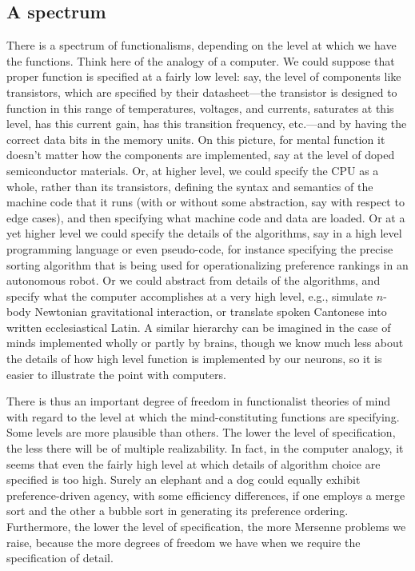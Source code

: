 \subsection{A spectrum}
There is a spectrum of functionalisms, depending on the level at which we have the functions. Think here of the analogy of a computer. 
We could suppose that proper function is specified at a fairly low
level: say, the level of  components like transistors, which are specified by their datasheet---the transistor is designed to 
function in this range of temperatures, voltages, and currents, saturates at this level, has this current gain, has this 
transition frequency, etc.---and by having the correct data bits in the memory units. On this picture, for mental function
it doesn't matter how the components are implemented, say at the level of doped semiconductor materials. Or, at 
higher level, we could specify the CPU as a whole, rather than its transistors, defining the syntax and semantics of the 
machine code that it runs (with or without some abstraction, say with respect to edge cases), and then specifying what machine 
code and data are loaded. Or at a yet higher level we could specify the details of the algorithms, say in a high level 
programming language or even pseudo-code, for instance specifying the precise sorting algorithm that is being used for 
operationalizing preference rankings in an autonomous robot. Or we could abstract from details of the algorithms, and specify 
what the computer accomplishes at a very high level, e.g., simulate $n$-body Newtonian gravitational interaction, or 
translate spoken Cantonese into written ecclesiastical Latin. A similar hierarchy can be imagined in the case of minds
implemented wholly or partly by brains, though we know much less about the details of how high level function is implemented
by our neurons, so it is easier to illustrate the point with computers.

There is thus an important degree of freedom in functionalist theories of mind with regard to the level at which the 
mind-constituting functions are specifying. Some levels are more plausible than others. The lower the level of specification,
the less there will be of multiple realizability. In fact, in the computer analogy, it seems that even the fairly high level
at which details of algorithm choice are specified is too high. Surely an elephant and a dog could equally exhibit preference-driven
agency, with some efficiency differences, if one employs a merge sort and the other a bubble sort in generating its preference 
ordering. Furthermore, the lower the level of specification, the more Mersenne problems we raise, because the more degrees of 
freedom we have when we require the specification of detail.

